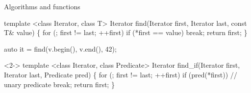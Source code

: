 \begin{frame}[fragile]{Algorithms and functions}

  \begin{codeblock}{\tiny
template <class Iterator, class T>
Iterator find(Iterator first, Iterator last, \alert{const T\& value})
\{
  for (; first != last; ++first)
    if (\alert{*first == value})
      break;
  return first;
\}

auto it = find(v.begin(), v.end(), 42);}\end{codeblock}

  \begin{codeblock}<2->
template <class Iterator, class Predicate>
Iterator find\alert{_if}(Iterator first, Iterator last, \alert{Predicate pred})
\{
  for (; first != last; ++first)
    if (\alert{pred(*first)})         // unary predicate
      break;
  return first;
\}


\end{codeblock}

\end{frame}

